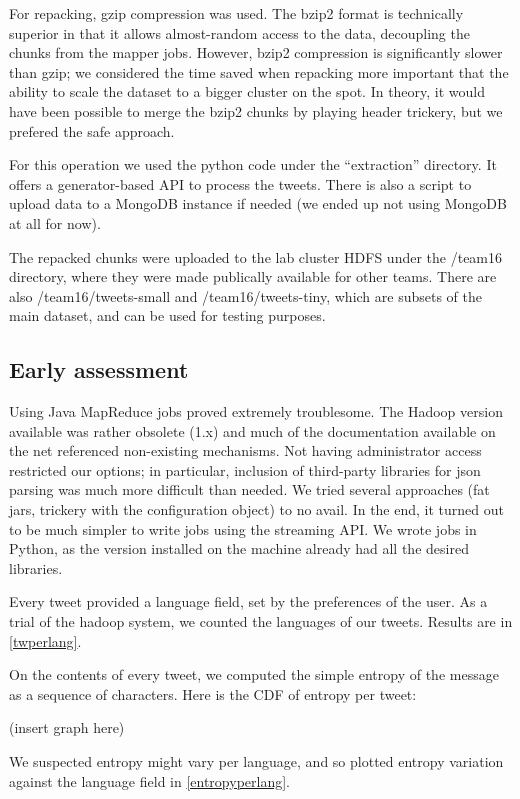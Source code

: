\documentclass[a4paper,11pt]{article}
\begin{document}
For repacking, gzip compression was used. The bzip2 format is technically superior in that it allows almost-random access to the data, decoupling the chunks from the mapper jobs. However, bzip2 compression is significantly slower than gzip; we considered the time saved when repacking more important that the ability to scale the dataset to a bigger cluster on the spot. In theory, it would have been possible to merge the bzip2 chunks by playing header trickery, but we prefered the safe approach.

For this operation we used the python code under the ``extraction'' directory. It offers a generator-based API to process the tweets. There is also a script to upload data to a MongoDB instance if needed (we ended up not using MongoDB at all for now).

The repacked chunks were uploaded to the lab cluster HDFS under the /team16 directory, where they were made publically available for other teams. There are also /team16/tweets-small and /team16/tweets-tiny, which are subsets of the main dataset, and can be used for testing purposes.

\subsection{Early assessment}

Using Java MapReduce jobs proved extremely troublesome. The Hadoop version available was rather obsolete (1.x) and much of the documentation available on the net referenced non-existing mechanisms. Not having administrator access restricted our options; in particular, inclusion of third-party libraries for json parsing was much more difficult than needed. We tried several approaches (fat jars, trickery with the configuration object) to no avail. In the end, it turned out to be much simpler to write jobs using the streaming API. We wrote jobs in Python, as the version installed on the machine already had all the desired libraries.

Every tweet provided a language field, set by the preferences of the user. As a trial of the hadoop system, we counted the languages of our tweets. Results are in \ref{twperlang}.

On the contents of every tweet, we computed the simple entropy of the message as a sequence of characters. Here is the CDF of entropy per tweet:

(insert graph here)

We suspected entropy might vary per language, and so plotted entropy variation against the language field in \ref{entropyperlang}.
\end{document}
